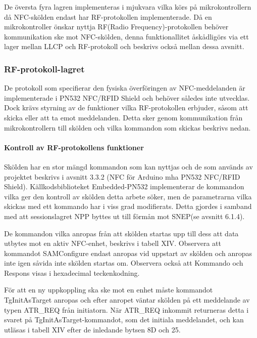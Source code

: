 \documentclass[11pt]{article}
\begin{document}

De översta fyra lagren implementeras i mjukvara vilka körs på mikrokontrollern då NFC-skölden endast har RF-protokollen implementerade. Då en mikrokontroller önskar nyttja RF(Radio Frequency)-protokollen behöver kommunikation ske mot NFC-skölden, denna funktionallitet åskådligörs via ett lager mellan LLCP och RF-protokoll och beskrivs också mellan dessa avsnitt.

\subsubsection{RF-protokoll-lagret}
De protokoll som specifierar den fysiska överföringen av NFC-meddelanden är implementerade i PN532 NFC/RFID Shield och behöver således inte utvecklas. Dock krävs styrning av de funktioner vilka RF-protokollen erbjuder, såsom att skicka eller att ta emot meddelanden. Detta sker genom kommunikation från mikrokontrollern till skölden och vilka kommandon som skickas beskrivs nedan.

\paragraph{Kontroll av RF-protokollens funktioner}
Skölden har en stor mängd kommandon som kan nyttjas och de som används av projektet beskrivs i avsnitt 3.3.2 (NFC för Arduino mha PN532 NFC/RFID Shield). Källkodsbiblioteket Embedded-PN532 implementerar de kommandon vilka ger den kontroll av skölden detta arbete söker, men de parametrarna vilka skickas med ett kommando har i viss grad modifierats. Detta gjordes i samband med att sessionslagret NPP byttes ut till förmån mot SNEP(se avsnitt 6.1.4).

De kommandon vilka anropas från att skölden startas upp till dess att data utbytes mot en aktiv NFC-enhet, beskrivs i tabell XIV. Observera att kommandot SAMConfigure endast anropas vid uppstart av skölden och anropas inte igen såvida inte skölden startas om. Observera också att Kommando och Respons visas i hexadecimal teckenkodning.


För att en ny uppkoppling ska ske mot en enhet måste kommandot TgInitAsTarget anropas och efter anropet väntar skölden på ett meddelande av typen ATR\_REQ från initiatorn. När ATR\_REQ inkommit returneras detta i svaret på TgInitAsTarget-kommandot, som det initiala meddelandet, och kan utläsas i tabell XIV efter de inledande bytsen 8D och 25.
\end{document}
